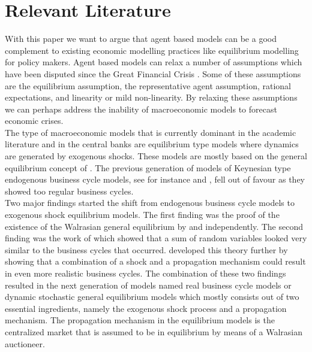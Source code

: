 
\section{Relevant Literature} %

\label{Literature} %


\newcommand{\keyword}[1]{\textbf{#1}}
\newcommand{\tabhead}[1]{\textbf{#1}}
\newcommand{\code}[1]{\texttt{#1}}
\newcommand{\file}[1]{\texttt{\bfseries#1}}
\newcommand{\option}[1]{\texttt{\itshape#1}}

With this paper we want to argue that agent based models can be a good complement to existing economic modelling practices like equilibrium modelling for policy makers. Agent based models can relax a number of assumptions which have been disputed since the Great Financial Crisis \citep{fagiolo_macroeconomic_2017}. Some of these assumptions are the equilibrium assumption, the representative agent assumption, rational expectations, and linearity or mild non-linearity. By relaxing these assumptions we can perhaps address the inability of macroeconomic models to forecast economic crises.\\

The type of macroeconomic models that is currently dominant in the academic literature and in the central banks are equilibrium type models where dynamics are generated by exogenous shocks. These models are mostly based on the general equilibrium concept of \cite{walras_elements_2013}.  The previous generation of models of Keynesian type endogenous business cycle models, see for instance \cite{kaldor_model_1940} and \cite{hicks_contribution_1950}, fell out of favour as they showed too regular business cycles. \\

Two major findings started the shift from endogenous business cycle models to exogenous shock equilibrium models. The first finding was the proof of the existence of the Walrasian general equilibrium by \cite{arrow_existence_1954} and \cite{mckenzie_equilibrium_1954} independently. The second finding was the work of \cite{slutzky_summation_1937} which showed that a sum of random variables looked very similar to the business cycles that occurred. \cite{hendry_propagation_1995} developed this theory further by showing that a combination of a shock and a propagation mechanism could result in even more realistic business cycles. The combination of these two findings resulted in the next generation of models named real business cycle models or dynamic stochastic general equilibrium models which mostly consists out of two essential ingredients, namely the exogenous shock process and a propagation mechanism. The propagation mechanism in the equilibrium models is the centralized market that is assumed to be in equilibrium by means of a Walrasian auctioneer. \\

